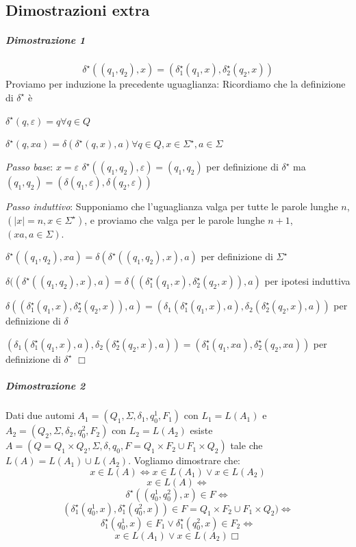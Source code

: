\subsection{Dimostrazioni extra}
\subparagraph{Dimostrazione 1}

\[
	\delta^{\star} ( (q_1, q_2), x) = (\delta_1^{\star} (q_1, x), \delta_2^{\star} (q_2, x))
\]
Proviamo per induzione la precedente uguaglianza:\newline
Ricordiamo che la definizione di $\delta^{\star}$ \`e 
\begin{description}
	\item $\delta^{\star}(q, \varepsilon) = q \forall q \in Q$ 
	\item $\delta^{\star}(q, xa) = \delta(\delta^{\star}(q, x), a) \forall q \in Q, x \in \Sigma^{\star}, a \in \Sigma$
\end{description}
\begin{description}
	\item \emph{Passo base}: $x = \varepsilon$ \newline
	$\delta^{\star} ( (q_1, q_2), \varepsilon) = (q_1, q_2)$ per definizione di $\delta^{\star}$  ma $(q_1, q_2) = ( \delta(q_1, \varepsilon), \delta(q_2, \varepsilon))$
	\item \emph{Passo induttivo}: Supponiamo che l'uguaglianza valga per tutte le parole lunghe $n$, $(|x|=n, x \in \Sigma^{\star})$, e proviamo che valga per le parole lunghe $n+1$, $(xa, a \in \Sigma)$.
	\begin{description}
		\item $\delta^{\star} ((q_1, q_2), xa) = \delta ( \delta^{\star}((q_1, q_2),x), a)$ per definizione di $\Sigma^{\star}$
		\item $\delta ( ( \delta^{\star}((q_1, q_2),x), a) = \delta (( \delta_1^{\star}(q_1, x),\delta_2^{\star}(q_2,x)), a)$ per ipotesi induttiva
		\item $\delta ( (\delta_1^{\star}(q_1, x),\delta_2^{\star}(q_2,x)), a) = ( \delta_1 (\delta_1^{\star}(q_1, x),a), \delta_2(\delta_2^{\star}(q_2,x),a))$ per definizione di $\delta$
		\item $( \delta_1 (\delta_1^{\star}(q_1, x),a), \delta_2(\delta_2^{\star}(q_2,x),a)) = ( \delta_1^{\star}(q_1, xa), \delta_2^{\star}(q_2,xa))$ per definizione di $\delta^{\star}$ $\Box$
	\end{description}

\end{description}
\subparagraph{Dimostrazione 2}
Dati due automi $A_1 = (Q_1, \Sigma, \delta_1, q^1_0, F_1)$ con $L_1=L(A_1)$ e $A_2 = (Q_2, \Sigma, \delta_2, q^2_0, F_2)$ con $L_2=L(A_2)$ esiste $A = (Q = Q_1 \times Q_2, \Sigma, \delta, q_0, F = Q_1 \times F_2 \cup F_1 \times Q_2)$ tale che $L(A) = L(A_1) \cup L(A_2)$. Vogliamo dimostrare che:
\[
	x \in L(A) \Leftrightarrow x \in L(A_1) \lor x \in L(A_2)
\]
\[
	x \in L(A) \Leftrightarrow
\]
\[
	 \delta^{\star} ((q^1_0, q^2_0), x) \in F \Leftrightarrow
\]
\[	
	 (\delta_1^{\star}(q^1_0, x),\delta_1^{\star}(q^2_0, x)) \in F = Q_1 \times F_2 \cup F_1 \times Q_2) \Leftrightarrow 
\]
\[	 
	 \delta_1^{\star}(q^1_0, x) \in F_1 \lor \delta_1^{\star}(q^2_0, x) \in F_2 \Leftrightarrow 
\]
\[	 
	 x \in L(A_1) \lor x \in L(A_2) \Box
\]
